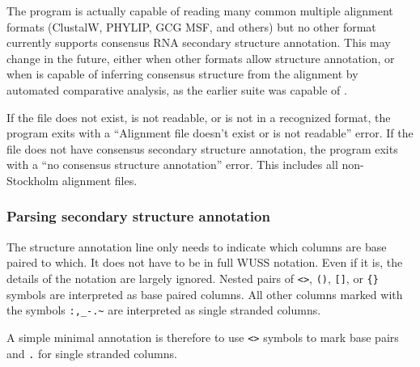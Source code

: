 The program is actually capable of reading many common multiple
alignment formats (ClustalW, PHYLIP, GCG MSF, and others) but no other
format currently supports consensus RNA secondary structure
annotation. This may change in the future, either when other formats
allow structure annotation, or when  is capable of
inferring consensus structure from the alignment by automated
comparative analysis, as the earlier  suite was capable
of \cite{Eddy94}. 

If the file does not exist, is not readable, or is not in a recognized
format, the program exits with a ``Alignment file doesn't exist or is
not readable'' error. If the file does not have consensus secondary
structure annotation, the program exits with a ``no consensus
structure annotation'' error. This includes all non-Stockholm
alignment files.

\subsubsection{Parsing secondary structure annotation}

The structure annotation line only needs to indicate which columns are
base paired to which. It does not have to be in full WUSS notation.
Even if it is, the details of the notation are largely ignored.
Nested pairs of \verb+<>+, \verb+()+, \verb+[]+, or \verb+{}+ symbols
are interpreted as base paired columns. All other columns marked with
the symbols \verb+:,_-.~+ are interpreted as single stranded columns.

A simple minimal annotation is therefore to use \verb+<>+ symbols to
mark base pairs and \verb+.+ for single stranded columns.

